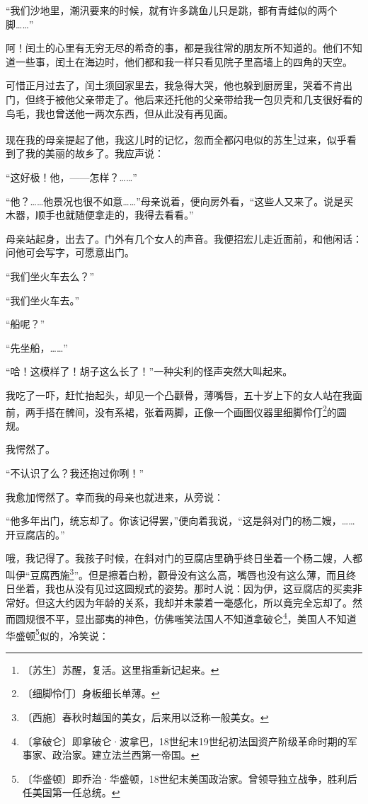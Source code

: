 \documentclass[12pt,UTF-8,openany]{ctexbook}
\begin{document}
\begin{large}
    “我们沙地里，潮汛要来的时候，就有许多跳鱼儿只是跳，都有青蛙似的两个脚……”
    
    阿！闰土的心里有无穷无尽的希奇的事，都是我往常的朋友所不知道的。他们不知道一些事，闰土在海边时，他们都和我一样只看见院子里高墙上的四角的天空。
    
    可惜正月过去了，闰土须回家里去，我急得大哭，他也躲到厨房里，哭着不肯出门，但终于被他父亲带走了。他后来还托他的父亲带给我一包贝壳和几支很好看的鸟毛，我也曾送他一两次东西，但从此没有再见面。
    
    现在我的母亲提起了他，我这儿时的记忆，忽而全都闪电似的苏生\footnote{〔苏生〕苏醒，复活。这里指重新记起来。}过来，似乎看到了我的美丽的故乡了。我应声说：
    
    “这好极！他，——怎样？……”
    
    “他？……他景况也很不如意……”母亲说着，便向房外看，“这些人又来了。说是买木器，顺手也就随便拿走的，我得去看看。”
    
    母亲站起身，出去了。门外有几个女人的声音。我便招宏儿走近面前，和他闲话：问他可会写字，可愿意出门。
    
    “我们坐火车去么？”
    
    “我们坐火车去。”
    
    “船呢？”
    
    “先坐船，……”
    
    “哈！这模样了！胡子这么长了！”一种尖利的怪声突然大叫起来。
    
    我吃了一吓，赶忙抬起头，却见一个凸颧骨，薄嘴唇，五十岁上下的女人站在我面前，两手搭在髀间，没有系裙，张着两脚，正像一个画图仪器里细脚伶仃\footnote{〔细脚伶仃〕身板细长单薄。}的圆规。
    
    我愕然了。
    
    “不认识了么？我还抱过你咧！”
    
    我愈加愕然了。幸而我的母亲也就进来，从旁说：
    
    “他多年出门，统忘却了。你该记得罢，”便向着我说，“这是斜对门的杨二嫂，……开豆腐店的。”
    
    哦，我记得了。我孩子时候，在斜对门的豆腐店里确乎终日坐着一个杨二嫂，人都叫伊“豆腐西施\footnote{〔西施〕春秋时越国的美女，后来用以泛称一般美女。}”。但是擦着白粉，颧骨没有这么高，嘴唇也没有这么薄，而且终日坐着，我也从没有见过这圆规式的姿势。那时人说：因为伊，这豆腐店的买卖非常好。但这大约因为年龄的关系，我却并未蒙着一毫感化，所以竟完全忘却了。然而圆规很不平，显出鄙夷的神色，仿佛嗤笑法国人不知道拿破仑\footnote{〔拿破仑〕即拿破仑·波拿巴，18世纪末19世纪初法国资产阶级革命时期的军事家、政治家。建立法兰西第一帝国。}，美国人不知道华盛顿\footnote{〔华盛顿〕即乔治·华盛顿，18世纪末美国政治家。曾领导独立战争，胜利后任美国第一任总统。}似的，冷笑说：
    

\end{large}
\end{document}
